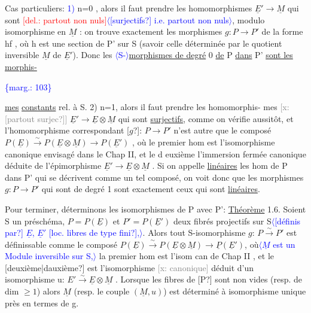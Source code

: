 \documentclass[11pt]{article}
\newcommand{\scanpage}[1]{\par\bigskip\noindent{\small\sffamily[scan #1]}\par}
\newcommand{\mspage}[1]{{\small\sffamily[p.\,#1]}}
\newcommand{\hand}[1]{\textcolor{blue}{#1}}
\newcommand{\inserted}[2][]{\textcolor{blue}{$\langle$#2$\rangle$}}
\newcommand{\margin}[1]{\textcolor{blue}{\{\textsf{marg.:} #1\}}}
\newcommand{\deleted}[1]{\textcolor{red}{[\textsf{del.:} #1]}}
\newcommand{\xout}[1]{\textcolor{gray}{[\textsf{x:} #1]}}
\newcommand{\uline}[1]{\underline{#1}}
\newcommand{\unsure}[1]{[#1?]}
\begin{document}
Cas particuliers: \hand{1)} n=0 , alors  il faut prendre  les  homomorphismes
$\underline{E}' \to \underline{M}$  qui sont \deleted{partout non nuls}\inserted{\unsure{surjectifs} i.e. partout non nuls}, modulo isomorphisme en $\underline{M}$ : on trouve
exactement les  morphismes  $g\colon P \to P'$  de la forme  hf , où  h est une
section de  P' sur S  (savoir celle déterminée par  le quotient inversible
$\underline{M}$ de $\underline{E}'$). Donc les \inserted{S-}\uline{morphismes de  degré} 0  \uline{de} P \uline{dans} P' \uline{sont les morphis-}%

\margin{103}

\clearpage
\scanpage{25/104}
\mspage{7}

\uline{mes} \uline{constants} rel. à S. 2) n=1, alors il faut prendre les homomorphis-%
mes \xout{\unsure{partout surjec}} $\underline{E}'\to \underline{E}\otimes\underline{M}$ qui sont \uline{surjectifs}, comme on vérifie
aussitôt, et l'homomorphisme correspondant \unsure{$g$}: $P\to P'$ n'est autre que le
composé $P(\underline{E})\xrightarrow{\sim}P(\underline{E}\otimes\underline{M})\to P(\underline{E}')$ , où le premier hom est l'isomorphisme
canonique envisagé dans le Chap II, et le d euxième l'immersion fermée
canonique déduite de l'épimorphisme $\underline{E}'\to\underline{E}\otimes\underline{M}$ . Si on appelle \uline{linéaires}
les hom de P dans P' qui se décrivent comme un tel composé, on voit donc
que les morphismes $g:P\to P'$ qui sont de degré 1 sont exactement ceux qui
sont \uline{linéaires}.

Pour terminer, déterminons les isomorphismes de P avec P':
\uline{Théorème} 1.6. Soient S un préschéma, $P=P(\underline{E})$ et $P'=P(\underline{E}')$ deux fibrés
projectifs sur S\inserted{\unsure{définis par} $\underline{E}$, $\underline{E}'$ \unsure{loc. libres de type fini},}. Alors tout S-isomorphisme $g$: $P\xrightarrow{\sim}P'$ est définissable
comme le composé $P(\underline{E})\xrightarrow{\sim}P(\underline{E}\otimes\underline{M})\to \underline{P}(\underline{E}')$, où\inserted{$\underline{M}$ est un Module inversible sur S,} la premier hom est l'isom
can de Chap II , et le \unsure{deuxième|dauxième} est l'isomorphisme \xout{canonique} déduit
d'un isomorphisme u: $E'\xrightarrow{\sim}\underline{E}\otimes\underline{M}$ . Lorsque les fibres de \unsure{P} sont non
vides (resp. de dim $\geq 1$) alors $\underline{M}$ (resp. le couple $(\underline{M},u)$) est déterminé
à isomorphisme unique près en termes de g.
\end{document}

